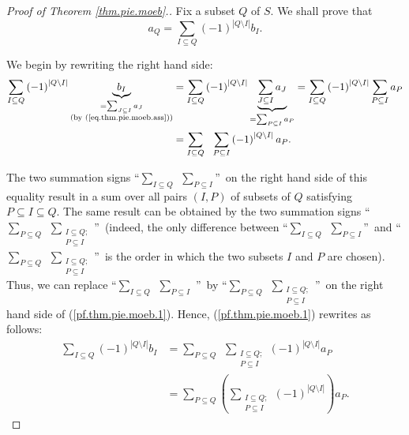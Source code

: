 \begin{proof}
[Proof of Theorem \ref{thm.pie.moeb}.]Fix a subset $Q$ of $S$. We shall prove
that%
\[
a_{Q}=\sum_{I\subseteq Q}\left(  -1\right)  ^{\left\vert Q\setminus
I\right\vert }b_{I}.
\]


We begin by rewriting the right hand side:%
\begin{align}
\sum_{I\subseteq Q}\left(  -1\right)  ^{\left\vert Q\setminus I\right\vert
}\underbrace{b_{I}}_{\substack{=\sum_{J\subseteq I}a_{J}\\\text{(by
(\ref{eq.thm.pie.moeb.ass}))}}}  &  =\sum_{I\subseteq Q}\left(  -1\right)
^{\left\vert Q\setminus I\right\vert }\underbrace{\sum_{J\subseteq I}a_{J}%
}_{=\sum_{P\subseteq I}a_{P}}=\sum_{I\subseteq Q}\left(  -1\right)
^{\left\vert Q\setminus I\right\vert }\sum_{P\subseteq I}a_{P}\nonumber\\
&  =\sum_{I\subseteq Q}\ \ \sum_{P\subseteq I}\left(  -1\right)  ^{\left\vert
Q\setminus I\right\vert }a_{P}. \label{pf.thm.pie.moeb.1}%
\end{align}


The two summation signs \textquotedblleft$\sum_{I\subseteq Q}\ \ \sum
_{P\subseteq I}$\textquotedblright\ on the right hand side of this equality
result in a sum over all pairs $\left(  I,P\right)  $ of subsets of $Q$
satisfying $P\subseteq I\subseteq Q$. The same result can be obtained by the
two summation signs \textquotedblleft$\sum_{P\subseteq Q}\ \ \sum
_{\substack{I\subseteq Q;\\P\subseteq I}}$\textquotedblright\ (indeed, the
only difference between \textquotedblleft$\sum_{I\subseteq Q}\ \ \sum
_{P\subseteq I}$\textquotedblright\ and \textquotedblleft$\sum_{P\subseteq
Q}\ \ \sum_{\substack{I\subseteq Q;\\P\subseteq I}}$\textquotedblright\ is the
order in which the two subsets $I$ and $P$ are chosen). Thus, we can replace
\textquotedblleft$\sum_{I\subseteq Q}\ \ \sum_{P\subseteq I}$%
\textquotedblright\ by \textquotedblleft$\sum_{P\subseteq Q}\ \ \sum
_{\substack{I\subseteq Q;\\P\subseteq I}}$\textquotedblright\ on the right
hand side of (\ref{pf.thm.pie.moeb.1}). Hence, (\ref{pf.thm.pie.moeb.1})
rewrites as follows:%
\begin{align}
\sum_{I\subseteq Q}\left(  -1\right)  ^{\left\vert Q\setminus I\right\vert
}b_{I}  &  =\sum_{P\subseteq Q}\ \ \sum_{\substack{I\subseteq Q;\\P\subseteq
I}}\left(  -1\right)  ^{\left\vert Q\setminus I\right\vert }a_{P}\nonumber\\
&  =\sum_{P\subseteq Q}\left(  \sum_{\substack{I\subseteq Q;\\P\subseteq
I}}\left(  -1\right)  ^{\left\vert Q\setminus I\right\vert }\right)  a_{P}.
\label{pf.thm.pie.moeb.2}%
\end{align}



\end{proof}
